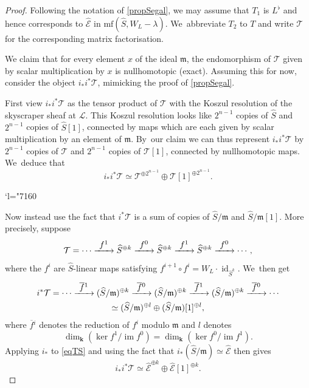 \documentclass[JEP,XML,SOM,Unicode,NoEqCountersInSection,NoFloatCountersInSection,published]{cedram}
\newcommand{\Changel}{\mathcode`l="7160}
\newcommand{\To}[1]{\mathchoice{\xrightarrow{\textstyle\kern4pt#1\kern3pt}}{\stackrel{#1}{\longrightarrow}}{}{}}
\theoremstyle{definition}
\newcommand{\id}{\operatorname{id}}
\newcommand{\LL}{L^\flat}
\newcommand{\hatS}{\widehat{S}}
\newcommand{\hatE}{\widehat{\calE}}
\newcommand{\calE}{\mathcal{E}}
\newcommand{\calL}{\mathcal{L}}
\newcommand{\calT}{\mathcal{T}}
\newcommand{\kk}{{\boldsymbol{k}}}
\newcommand{\m}{\mathfrak{m}}
\newcommand{\mf}{\mathrm{mf}}
\begin{document}
\begin{proof}
Following the notation of \cref{propSegal}, we may assume that $T_1$ is $\LL$ and hence corresponds to $\hatE$ in $\mf(\hatS, W_L - \lambda)$. We~abbreviate $T_2$ to $T$ and write $\calT$ for the corresponding matrix factorisation.

We claim that for every element $x$ of the ideal $\m$, the endomorphism of $\calT$ given by scalar multiplication by $x$ is nullhomotopic (\ie exact). Assuming this for now, consider the object $i_*i^*\calT$, mimicking the proof of \cref{propSegal}.

First view $i_*i^*\calT$ as the tensor product of $\calT$ with the Koszul resolution of the skyscraper sheaf at $\calL$. This Koszul resolution looks like $2^{n-1}$ copies of $\hatS$ and $2^{n-1}$ copies of $\hatS[1]$, connected by maps which are each given by scalar multiplication by an element of $\m$. By~our claim we can thus represent $i_*i^*\calT$ by $2^{n-1}$ copies of $\calT$ and $2^{n-1}$ copies of $\calT[1]$, connected by nullhomotopic maps. We~deduce that
\begin{equation}
\label{eqTT}
i_*i^*\calT \simeq \calT^{\oplus 2^{n-1}} \oplus \calT[1]^{\oplus 2^{n-1}}.
\end{equation}

\Changel

Now instead use the fact that $i^*\calT$ is a sum of copies of $\hatS/\m$ and $\hatS/\m[1]$. More precisely, suppose
\[
\calT = \cdots \To{f^1} \hatS^{\oplus k} \To{f^0} \hatS^{\oplus k} \To{f^1} \hatS^{\oplus k} \To{f^0} \cdots,
\]
where the $f^i$ are $\hatS$-linear maps satisfying $f^{i+1} \circ f^{i} = W_L \cdot \id_{\hatS^k}$. We~then get
\begin{multline}
\label{eqTS}
i^*\calT = \cdots \To{\overline{f}{}^1} (\hatS/\m)^{\oplus k} \To{\overline{f}{}^0} (\hatS/\m)^{\oplus k} \To{\overline{f}{}^1} (\hatS/\m)^{\oplus k} \To{\overline{f}{}^0} \cdots \\ \simeq (\hatS/\m)^{\oplus l} \oplus (\hatS/\m)[1]^{\oplus l},
\end{multline}
where $\overline{f}{}^i$ denotes the reduction of $f^i$ modulo $\m$ and $l$ denotes
\[
\dim_\kk (\ker f^1 / \operatorname{im} f^0) = \dim_\kk (\ker f^0 / \operatorname{im} f^1).
\]
Applying $i_*$ to \eqref{eqTS} and using the fact that $i_*(\hatS/\m) \simeq \hatE$ then gives
\begin{equation}
\label{eqTE}
i_*i^* \calT \simeq \hatE^{\oplus k} \oplus \hatE[1]^{\oplus k}.
\end{equation}


\end{proof}
\end{document}
